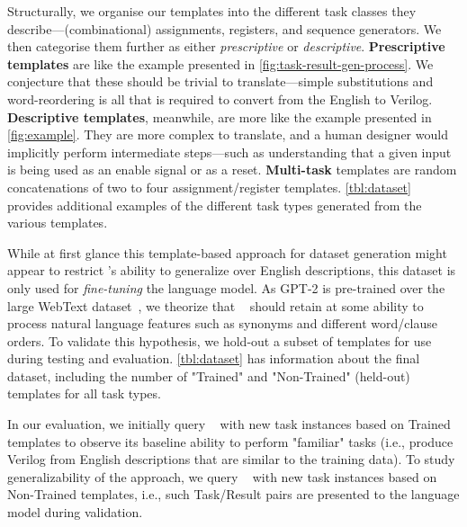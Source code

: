 Structurally, we organise our templates into the different task classes they describe---(combinational) assignments, registers, and sequence generators.
We then categorise them further as either \emph{prescriptive} or \emph{descriptive}. 
\textbf{Prescriptive templates} are like the example presented in \autoref{fig:task-result-gen-process}. 
We conjecture that these should be trivial to translate---simple substitutions and word-reordering is all that is required to convert from the English to Verilog.
\textbf{Descriptive templates}, meanwhile, are more like the example presented in \autoref{fig:example}. 
They are more complex to translate, and a human designer would implicitly perform intermediate steps---such as understanding that a given input is being used as an enable signal or as a reset.
\textbf{Multi-task} templates are random concatenations of two to four assignment/register templates. 
\autoref{tbl:dataset} provides additional examples of the different task types generated from the various templates. 

While at first glance this template-based approach for dataset generation might appear to restrict \sol's ability to generalize over English descriptions, this dataset is only used for \emph{fine-tuning} the language model. As GPT-2 is pre-trained over the large WebText dataset~\cite{radford2019language}, we theorize that \sol~ should retain at some ability to process natural language features such as  synonyms and different word/clause orders. To validate this hypothesis, we hold-out a subset of templates for use during testing and evaluation. 
\autoref{tbl:dataset} has information about the final dataset, including the number of "Trained" and "Non-Trained" (held-out) templates for all task types. 


In our evaluation, we initially query \sol~ with new task instances based on Trained templates to observe its baseline ability to perform "familiar" tasks (i.e., produce Verilog from English descriptions that are similar to the training data). 
To study generalizability of the approach, we query \sol~ with new task instances based on Non-Trained templates, i.e., such Task/Result pairs %
are presented to the language model during validation.

